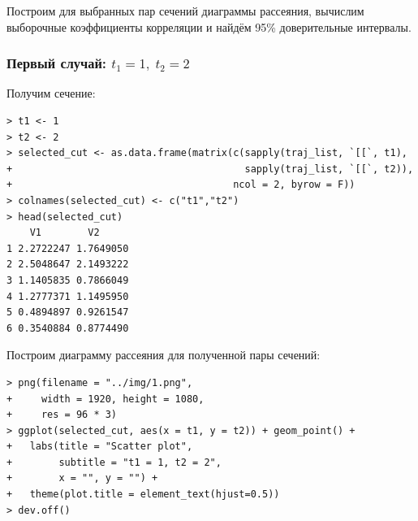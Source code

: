 \documentclass[14pt,a4paper]{scrartcl}
\begin{document}
Построим для выбранных пар сечений диаграммы рассеяния, вычислим выборочные коэффициенты корреляции и найдём 95\% доверительные интервалы. \\
\subsubsection*{Первый случай: $t_1 = 1, \; t_2 = 2$}
Получим сечение:

\begin{verbatim}
> t1 <- 1
> t2 <- 2
> selected_cut <- as.data.frame(matrix(c(sapply(traj_list, `[[`, t1),
+                                        sapply(traj_list, `[[`, t2)),
+                                      ncol = 2, byrow = F))
> colnames(selected_cut) <- c("t1","t2")
> head(selected_cut)
	V1        V2
1 2.2722247 1.7649050
2 2.5048647 2.1493222
3 1.1405835 0.7866049
4 1.2777371 1.1495950
5 0.4894897 0.9261547
6 0.3540884 0.8774490
\end{verbatim}

Построим диаграмму рассеяния для полученной пары сечений:

\begin{verbatim}
> png(filename = "../img/1.png",
+     width = 1920, height = 1080,
+     res = 96 * 3)
> ggplot(selected_cut, aes(x = t1, y = t2)) + geom_point() +
+   labs(title = "Scatter plot",
+        subtitle = "t1 = 1, t2 = 2",
+        x = "", y = "") + 
+   theme(plot.title = element_text(hjust=0.5))
> dev.off()
\end{verbatim}

\begin{figure}[H]
	\begin{minipage}[h]{1\linewidth}
		  \\
	\end{minipage}
\end{figure}
\end{document}
